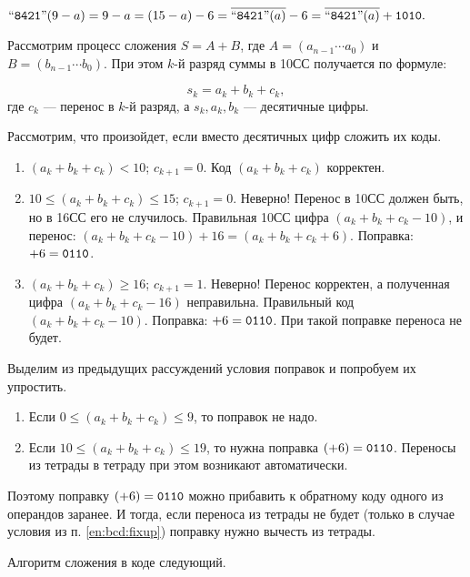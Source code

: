 $\text{``\texttt{8421}''}(9-a)=9-a=(15-a)-6=\overline{\text{``\texttt{8421}''}(a)}-6=\overline{\text{``\texttt{8421}''}(a)}+\texttt{1010}.$

Рассмотрим процесс сложения $S=A+B$, где $A=(a_{n-1}\cdots a_0)$ и $B=(b_{n-1}\cdots b_0)$. При этом $k$-й разряд суммы в 10СС получается по формуле:

\begin{equation}
    \label{eq:bcd:decAddition}
    s_k=a_k+b_k+c_k,
\end{equation}
где $c_k$ --- перенос в $k$-й разряд, а $s_k,a_k,b_k$ --- десятичные цифры.

Рассмотрим, что произойдет, если вместо десятичных цифр сложить их коды.
\begin{enumerate}
    \item $(a_k+b_k+c_k)<10$; $c_{k+1}=0$. Код $(a_k+b_k+c_k)$ корректен.
    
    \item $10\leq (a_k+b_k+c_k)\leq 15$; $c_{k+1}=0$. Неверно! Перенос в 10СС должен быть, но в 16СС его не случилось. Правильная 10СС цифра $(a_k+b_k+c_k-10)$, и перенос: $(a_k+b_k+c_k-10)+16=(a_k+b_k+c_k+6)$. Поправка: $+6=\texttt{0110}$.
    
    \item $(a_k+b_k+c_k)\geq 16$; $c_{k+1}=1$. Неверно! Перенос корректен, а полученная цифра $(a_k+b_k+c_k-16)$ неправильна. Правильный код $(a_k+b_k+c_k-10)$. Поправка: $+6=\texttt{0110}$. При такой поправке переноса не будет.
\end{enumerate}

Выделим из предыдущих рассуждений условия поправок и попробуем их упростить.
\begin{enumerate}
    \item\label{en:bcd:fixup} Если $0\leq(a_k+b_k+c_k)\leq 9$, то поправок не надо.
    \item Если $10\leq(a_k+b_k+c_k)\leq 19$, то нужна поправка $(+6)=\texttt{0110}$. Переносы из тетрады в тетраду при этом возникают автоматически.
\end{enumerate}

Поэтому поправку $(+6)=\texttt{0110}$ можно прибавить к обратному коду одного из операндов заранее. И тогда, если переноса из тетрады не будет (только в случае условия из п. \ref{en:bcd:fixup}) поправку нужно вычесть из тетрады.

Алгоритм сложения в коде {\NaturalLabel} следующий.

